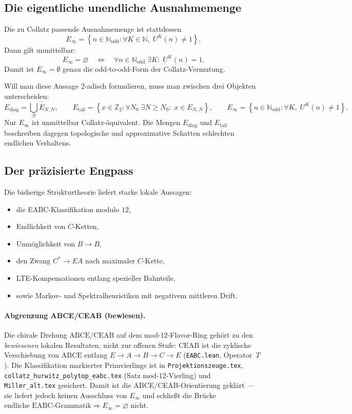 \documentclass[12pt,a4paper]{article}
\newcommand{\N}{\mathbb{N}}
\newcommand{\Ztwo}{\mathbb{Z}_2}
\newcommand{\Nodd}{\mathbb{N}_{\mathrm{odd}}}
\newcommand{\Einf}{E_{\infty}}
\newcommand{\Ediag}{E_{\mathrm{diag}}}
\newcommand{\Etail}{E_{\mathrm{tail}}}
\begin{document}
\subsection{Die eigentliche unendliche Ausnahmemenge}

Die zu Collatz passende Ausnahmemenge ist stattdessen
\[
\Einf
=
\left\{
n\in\Nodd:
\forall K\in\N,\; U^K(n)\neq 1
\right\}.
\]
Dann gilt unmittelbar:
\[
\Einf=\varnothing
\quad\Longleftrightarrow\quad
\forall n\in\Nodd\;\exists K:\; U^K(n)=1.
\]
Damit ist $\Einf=\emptyset$ genau die odd-to-odd-Form der Collatz-Vermutung.

Will man diese Aussage 2-adisch formulieren, muss man zwischen drei Objekten unterscheiden:
\[
\Ediag
=
\overline{\bigcup_N E_{N,N}},
\qquad
\Etail
=
\left\{
x\in\Ztwo:
\forall N_0\;\exists N\geq N_0:\; x\in E_{N,N}
\right\},
\qquad
\Einf
=
\left\{
n\in\Nodd:
\forall K,\;U^K(n)\neq 1
\right\}.
\]
Nur $\Einf$ ist unmittelbar Collatz-äquivalent. Die Mengen $\Ediag$ und $\Etail$ beschreiben dagegen topologische und approximative Schatten schlechten endlichen Verhaltens.

\subsection{Der präzisierte Engpass}

Die bisherige Strukturtheorie liefert starke lokale Aussagen:
\begin{itemize}
\item die EABC-Klassifikation modulo $12$,
\item Endlichkeit von $C$-Ketten,
\item Unmöglichkeit von $B\to B$,
\item den Zwang $C^\ast\to EA$ nach maximaler $C$-Kette,
\item LTE-Kompensationen entlang spezieller Bahnteile,
\item sowie Markov- und Spektralheuristiken mit negativem mittleren Drift.
\end{itemize}

\paragraph{Abgrenzung ABCE/CEAB (bewiesen).}
Die chirale Drehung $\mathrm{ABCE}/\mathrm{CEAB}$ auf dem mod-$12$-Flavor-Ring
gehört zu den \emph{bewiesenen} lokalen Resultaten, nicht zur offenen Stufe:
$\mathrm{CEAB}$ ist die zyklische Verschiebung von $\mathrm{ABCE}$ entlang
$E\to A\to B\to C\to E$ (\texttt{EABC.lean}, Operator~$T$).
Die Klassifikation markierter Primvierlinge ist in \texttt{Projektionszeuge.tex},
\texttt{collatz\_hurwitz\_polytop\_eabc.tex} (Satz mod-$12$-Vierling) und
\texttt{Miller\_alt.tex} gesichert.
Damit ist die ABCE/CEAB-Orientierung geklärt --- sie liefert jedoch keinen Ausschluss
von $\Einf$ und schließt die Brücke
$\text{endliche EABC-Grammatik}\Rightarrow\Einf=\varnothing$ nicht.
\end{document}
